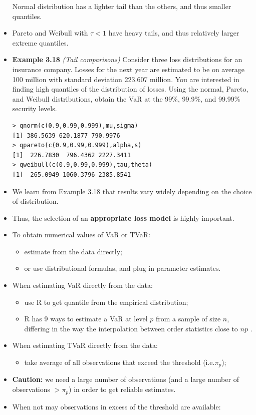 \documentclass[]{book}
\providecommand{\tightlist}{%
  \setlength{\itemsep}{0pt}\setlength{\parskip}{0pt}}
\theoremstyle{definition}
\theoremstyle{definition}
\theoremstyle{definition}
\theoremstyle{remark}
\begin{document}
\begin{itemize}
  Normal distribution has a lighter tail than the others, and thus
  smaller quantiles.
\item
  Pareto and Weibull with \(\tau<1\) have heavy tails, and thus
  relatively larger extreme quantiles.
\item
  \textbf{Example 3.18} \emph{(Tail comparisons)} Consider three loss
  distributions for an insurance company. Losses for the next year are
  estimated to be on average 100 million with standard deviation 223.607
  million. You are interested in finding high quantiles of the
  distribution of losses. Using the normal, Pareto, and Weibull
  distributions, obtain the VaR at the 99\%, 99.9\%, and 99.99\%
  security levels.

\begin{verbatim}
> qnorm(c(0.9,0.99,0.999),mu,sigma)
[1] 386.5639 620.1877 790.9976
> qpareto(c(0.9,0.99,0.999),alpha,s)
[1]  226.7830  796.4362 2227.3411
> qweibull(c(0.9,0.99,0.999),tau,theta)
[1]  265.0949 1060.3796 2385.8541
\end{verbatim}
\item
  We learn from Example 3.18 that results vary widely depending on the
  choice of distribution.
\item
  Thus, the selection of an \textbf{appropriate loss model} is highly
  important.
\item
  To obtain numerical values of VaR or TVaR:

  \begin{itemize}
  \item
    estimate from the data directly;
  \item
    or use distributional formulas, and plug in parameter estimates.
  \end{itemize}
\item
  When estimating VaR directly from the data:

  \begin{itemize}
  \item
    use R to get quantile from the empirical distribution;
  \item
    R has 9 ways to estimate a VaR at level \(p\) from a sample of size
    \(n\), differing in the way the interpolation between order
    statistics close to \(np\) .
  \end{itemize}
\item
  When estimating TVaR directly from the data:

  \begin{itemize}
  \tightlist
  \item
    take average of all observations that exceed the threshold
    (i.e.\(\pi_p\));
  \end{itemize}
\item
  \textbf{Caution:} we need a large number of observations (and a large
  number of observations \(> \pi_p\)) in order to get reliable
  estimates.
\item
  When not may observations in excess of the threshold are available:


\end{itemize}
\end{document}
